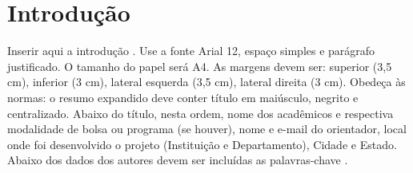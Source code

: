 \section{Introdução}

Inserir aqui a introdução \cite{civitello2007cuisine}. Use a fonte Arial 12, 
espaço simples e parágrafo justificado. O tamanho do papel será A4. As margens 
devem ser: superior (3,5 cm), inferior (3 cm), lateral esquerda (3,5 cm), 
lateral direita (3 cm). Obedeça às normas: o resumo expandido deve conter 
título em maiúsculo, negrito e centralizado. Abaixo do título, nesta ordem,
 nome dos acadêmicos e respectiva modalidade de bolsa ou programa (se houver), 
nome e e-mail do orientador, local onde foi desenvolvido o projeto 
(Instituição e Departamento), Cidade e Estado. Abaixo dos dados dos autores 
devem ser incluídas as palavras-chave \cite{Bistromatic}.
